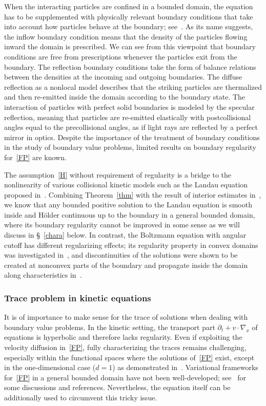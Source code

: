\documentclass[AHL,Unicode,longabstracts,published]{cedram}
\newcommand*\p{\partial}
\begin{document}
When the interacting particles are confined in a bounded domain, the equation has to be supplemented with physically relevant boundary conditions that take into account how particles behave at the boundary; see~\cite{Cerci2,Maxwell}. As its name suggests, the inflow boundary condition means that the density of the particles flowing inward the domain is prescribed. We can see from this viewpoint that boundary conditions are free from prescriptions whenever the particles exit from the boundary. The reflection boundary conditions take the form of balance relations between the densities at the incoming and outgoing boundaries. The diffuse reflection as a nonlocal model describes that the striking particles are thermalized and then re-emitted inside the domain according to the boundary state. The interaction of particles with perfect solid boundaries is modeled by the specular reflection, meaning that particles are re-emitted elastically with postcollisional angles equal to the precollisional angles, as if light rays are reflected by a perfect mirror in optics. Despite the importance of the treatment of boundary conditions in the study of boundary value problems, limited results on boundary regularity for~\eqref{FP} are known.

The assumption~\eqref{H} without requirement of regularity is a bridge to the nonlinearity of various collisional kinetic models such as the Landau equation proposed in~\cite{Landau}. Combining Theorem~\ref{thm} with the result of interior estimates in~\cite{HS}, we know that any bounded positive solution to the Landau equation is smooth inside and H\"older continuous up to the boundary in a general bounded domain, where its boundary regularity cannot be improved in some sense as we will discuss in \S~\ref{chara} below. In contrast, the Boltzmann equation with angular cutoff has different regularizing effects; its regularity property in convex domains was investigated in~\cite{GKTT}, and discontinuities of the solutions were shown to be created at nonconvex parts of the boundary and propagate inside the domain along characteristics in~\cite{Kim}.

\subsubsection{Trace problem in kinetic equations}\label{trace-pro}
It is of importance to make sense for the trace of solutions when dealing with boundary value problems. In the kinetic setting, the transport part $\p_t+v\cdot\nabla_x$ of equations is hyperbolic and therefore lacks regularity. Even if exploiting the velocity diffusion in~\eqref{FP}, fully characterizing the traces remains challenging, especially within the functional spaces where the solutions of~\eqref{FP} exist, except in the one-dimensional case ($d=1$) as demonstrated in~\cite[Theorem~1]{BG}. Variational frameworks for~\eqref{FP} in a general bounded domain have not been well-developed; see~\cite{AM2021} for some discussions and references. Nevertheless, the equation itself can be additionally used to circumvent this tricky issue.
\end{document}
